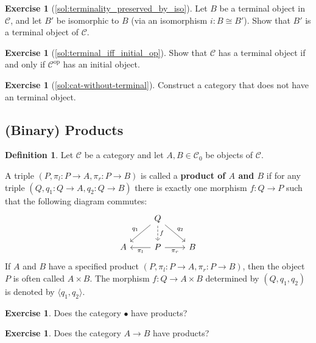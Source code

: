 \documentclass[a4paper,10pt]{scrartcl}
\theoremstyle{plain}
\theoremstyle{definition}
\newtheorem{dfn}[thm]{Definition}
\newtheorem{exer}[thm]{Exercise}
\newcommand{\Cat}[1]{\mathcal{#1}}
\newcommand{\CC}{\Cat{C}}
\newcommand{\Ob}[1]{{#1}_0}
\newcommand{\op}[1]{\ensuremath{{#1}^\text{op}}}
\newcommand{\projl}{\ensuremath{\pi_l}}
\newcommand{\projr}{\ensuremath{\pi_r}}
\begin{document}
\begin{exer}[\cref{sol:terminality_preserved_by_iso}]\label{exer:terminality_preserved_by_iso}
  Let $B$ be a terminal object in $\CC$, and let $B'$ be isomorphic to $B$ (via an isomorphism $i : B \cong B'$).
  Show that $B'$ is a terminal object of $\CC$.
\end{exer}

\begin{exer}[\cref{sol:terminal_iff_initial_op}]\label{exer:terminal_iff_initial_op}
  Show that $\CC$ has a terminal object if and only if $\op\CC$ has an initial object.
\end{exer}

\begin{exer}[\cref{sol:cat-without-terminal}]\label{exer:cat-without-terminal}
  Construct a category that does not have an terminal object.
\end{exer}

\subsection{(Binary) Products}
\label{sec:products}



\begin{dfn}\label{def:binproduct}
  Let $\CC$ be a category and let $A,B \in \Ob\CC$ be objects of $\CC$.

  A triple $(P,\projl : P \to A ,\projr : P \to B)$ is called a \textbf{product of $A$ and $B$} if for any triple $(Q,q_1 : Q \to A, q_2 : Q \to B)$ there is exactly one morphism $f : Q \to P$ such that the following diagram commutes:
  \[
    \begin{tikzcd}
      &
      Q \ar[ld, "q_1"'] \ar[rd, "q_2"] \ar[d, dashed, "f"]
      &
      \\
      A
      &
      P \ar[l, "\projl"] \ar[r, "\projr"']
      &
      B
    \end{tikzcd}
  \]
  If $A$ and $B$ have a specified product $(P,\projl : P \to A ,\projr : P \to B)$, then the object $P$ is often called $A \times B$.
  The morphism $f : Q \to A \times B$ determined by $(Q, q_1, q_2)$ is denoted by $\langle q_1, q_2 \rangle$.
\end{dfn}



\begin{exer}
  Does the category $\bullet$ have products?
\end{exer}

\begin{exer}
  Does the category $A \to B$ have products?
\end{exer}
\end{document}
